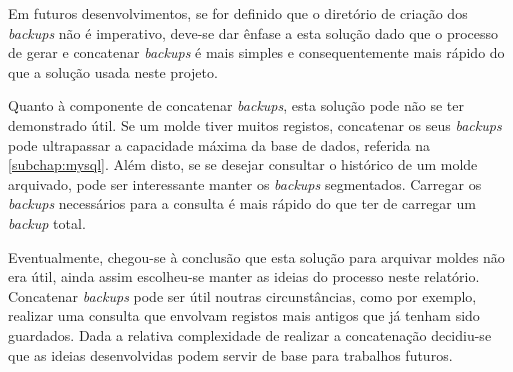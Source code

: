 \documentclass[11pt,twoside,a4paper]{report}
\begin{document}
Em futuros desenvolvimentos, se for definido que o diretório de criação dos \textit{backups} não é imperativo, deve-se dar ênfase a esta solução dado que o processo de gerar e concatenar \textit{backups} é mais simples e consequentemente mais rápido do que a solução usada neste projeto.\par 
Quanto à componente de concatenar \textit{backups}, esta solução pode não se ter demonstrado útil. Se um molde tiver muitos registos, concatenar os seus \textit{backups} pode ultrapassar a capacidade máxima da base de dados, referida na \autoref{subchap:mysql}. Além disto, se se desejar consultar o histórico de um molde arquivado, pode ser interessante manter os \textit{backups} segmentados. Carregar os \textit{backups} necessários para a consulta é mais rápido do que ter de carregar um \textit{backup} total.\par 
Eventualmente, chegou-se à conclusão que esta solução para arquivar moldes não era útil, ainda assim escolheu-se manter as ideias do processo neste relatório. Concatenar \textit{backups} pode ser útil noutras circunstâncias, como por exemplo, realizar uma consulta que envolvam registos mais antigos que já tenham sido guardados. Dada a relativa complexidade de realizar a concatenação decidiu-se que as ideias desenvolvidas podem servir de base para trabalhos futuros.
\end{document}
